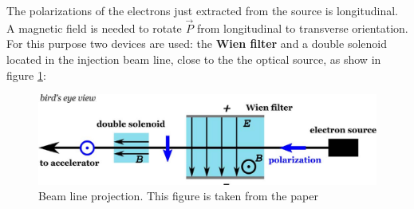 The polarizations of the electrons just extracted from the source is longitudinal. A magnetic field is needed to rotate $\vec{P}$ from longitudinal to transverse orientation. For this purpose two devices are used: the \textbf{Wien filter} and a double solenoid located in the injection beam line, close to the the optical source, as show in figure \ref{fig:Iniezione}:

\begin{figure}[hbtp]
\centering
\includegraphics[width = \textwidth]{ExperimentalSetup/injection.png}
\caption{Beam line projection. This figure is taken from the paper \cite{Schlimme:2016rrp}}
\label{fig:Iniezione}
\end{figure}


